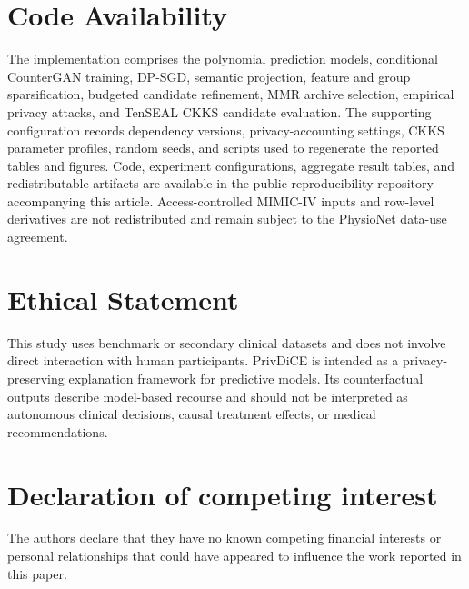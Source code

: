 \documentclass[preprint,12pt]{elsarticle}
\begin{document}
\section*{Code Availability}

The implementation comprises the polynomial prediction models, conditional
CounterGAN training, DP-SGD, semantic projection, feature and group
sparsification, budgeted candidate refinement, MMR archive selection, empirical
privacy attacks, and TenSEAL CKKS candidate evaluation. The supporting
configuration records dependency versions, privacy-accounting settings, CKKS
parameter profiles, random seeds, and scripts used to regenerate the reported
tables and figures. Code, experiment configurations, aggregate result tables,
and redistributable artifacts are available in the public reproducibility
repository accompanying this article.
Access-controlled MIMIC-IV inputs and row-level derivatives are not redistributed
and remain subject to the PhysioNet data-use agreement.

\section*{Ethical Statement}

This study uses benchmark or secondary clinical datasets and does not involve
direct interaction with human participants. PrivDiCE is intended as a
privacy-preserving explanation framework for predictive models. Its
counterfactual outputs describe model-based recourse and should not be
interpreted as autonomous clinical decisions, causal treatment effects, or
medical recommendations.

\section*{Declaration of competing interest}

The authors declare that they have no known competing financial interests or
personal relationships that could have appeared to influence the work reported
in this paper.

{}
\end{document}

